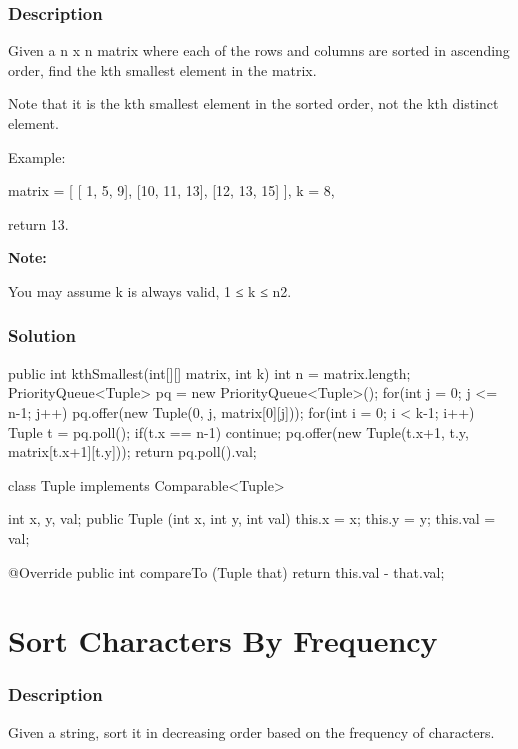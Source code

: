\subsubsection{Description}
Given a n x n matrix where each of the rows and columns are sorted in ascending order, find the kth smallest element in the matrix.

Note that it is the kth smallest element in the sorted order, not the kth distinct element.

Example:

\begin{Code}
matrix = [
   [ 1,  5,  9],
   [10, 11, 13],
   [12, 13, 15]
],
k = 8,

return 13.
\end{Code}

\textbf{Note:}

You may assume k is always valid, 1 ≤ k ≤ n2.

\subsubsection{Solution}

\begin{Code}
public int kthSmallest(int[][] matrix, int k) {
    int n = matrix.length;
    PriorityQueue<Tuple> pq = new PriorityQueue<Tuple>();
    for(int j = 0; j <= n-1; j++) pq.offer(new Tuple(0, j, matrix[0][j]));
    for(int i = 0; i < k-1; i++) {
        Tuple t = pq.poll();
        if(t.x == n-1) continue;
        pq.offer(new Tuple(t.x+1, t.y, matrix[t.x+1][t.y]));
    }
    return pq.poll().val;
}

class Tuple implements Comparable<Tuple> {
    int x, y, val;
    public Tuple (int x, int y, int val) {
        this.x = x;
        this.y = y;
        this.val = val;
    }

    @Override
    public int compareTo (Tuple that) {
        return this.val - that.val;
    }
}
\end{Code}

\newpage

\section{Sort Characters By Frequency} %

\subsubsection{Description}
Given a string, sort it in decreasing order based on the frequency of characters.


